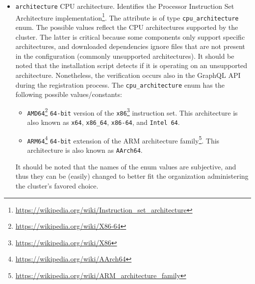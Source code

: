 \begin{itemize}
  \item \texttt{architecture}
    \newline
    CPU architecture.
    \newline
    Identifies the Processor Instruction Set Architecture implementation\footnote{\url{https://wikipedia.org/wiki/Instruction_set_architecture}}.
    \newline
    The attribute is of type \texttt{cpu\_architecture} enum. The possible
    values reflect the CPU architectures supported by the cluster. The latter is
    critical because some components only support specific architectures, and
    downloaded dependencies ignore files that are not present in the
    configuration (commonly unsupported architectures). It should be noted that the
    installation script detects if it is operating on an unsupported architecture.
    Nonetheless, the verification occurs also in the GraphQL API during the registration
    process.
    \newline
    The \texttt{cpu\_architecture} enum has the following possible values/constants:
    \begin{itemize}
      \item \texttt{AMD64}\footnote{\url{https://wikipedia.org/wiki/X86-64}}
        \newline
        \texttt{64-bit} version of the \texttt{x86}\footnote{\url{https://wikipedia.org/wiki/X86}}
        instruction set.
        \newline
        This architecture is also known as \texttt{x64}, \texttt{x86\_64}, \texttt{x86-64},
        and \texttt{Intel 64}.

      \item \texttt{ARM64}\footnote{\url{https://wikipedia.org/wiki/AArch64}}
        \newline
        \texttt{64-bit} extension of the ARM architecture family\footnote{\url{https://wikipedia.org/wiki/ARM_architecture_family}}.
        \newline
        This architecture is also known as \texttt{AArch64}.
    \end{itemize}
    It should be noted that the names of the enum values are subjective, and thus
    they can be (easily) changed to better fit the organization administering the
    cluster's favored choice.


\end{itemize}
